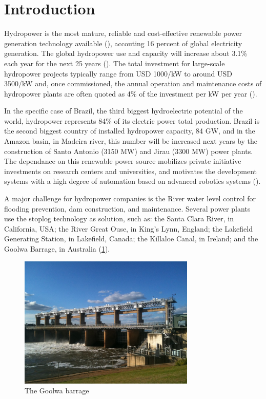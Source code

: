 \section{Introduction}
Hydropower is the most mature, reliable and cost-effective
renewable power generation technology available (\cite{brown}), accouting 16
percent of global electricity generation. The global hydropower use and
capacity will increase about 3.1\% each year for the next 25 years (\cite{wi}).
The total investment for large-scale hydropower projects
typically range from USD 1000/kW to around USD 3500/kW and, once commissioned,
the annual operation and maintenance costs of hydropower plants are often
quoted as 4\% of the investment per kW per year (\cite{ecofys}). 

In the specific case of Brazil, the third biggest hydroelectric potential of
the world, hydropower represents 84\% of its electric power total production.
Brazil is the second biggest country of installed hydropower capacity, 84 GW,
and in the Amazon basin, in Madeira river, this number will be increased next
years by the construction of Santo Antonio (3150 MW) and Jirau (3300 MW) power
plants. The dependance on this renewable power source mobilizes private
initiative investments on research centers and universities, and motivates the
development systems with a high degree of automation based on advanced robotics
systems (\cite{aneel}).

A major challenge for hydropower companies is the River water level
control for flooding prevention, dam construction, and maintenance. Several
power plants use the stoplog technology as solution, such as: the Santa Clara
River, in California, USA; the River Great Ouse, in King's Lynn, England; the
Lakefield Generating Station, in Lakefield, Canada; the Killaloe Canal, in
Ireland; and the Goolwa Barrage, in Australia (\ref{figs:intro:goolwa}). 

\begin{figure}[ht]
\centering
\includegraphics[width=8.4cm]{figs/intro/goolwa.jpg}
\caption{The Goolwa barrage}
\label{figs:intro:goolwa}
\end{figure}

